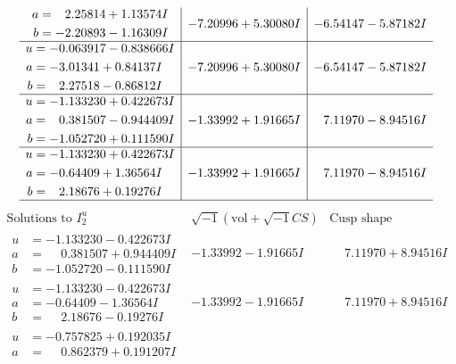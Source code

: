 \documentclass[1p]{elsarticle_modified}
\theoremstyle{definition}
\newcommand{\I}{\sqrt{-1}}
\begin{document}
$$\begin{array}{c|c|c}
\begin{aligned}
a &= \phantom{-}2.25814 + 1.13574 I \\
b &= -2.20893 - 1.16309 I\end{aligned}
 & -7.20996 + 5.30080 I & -6.54147 - 5.87182 I \\ \hline\begin{aligned}
u &= -0.063917 - 0.838666 I \\
a &= -3.01341 + 0.84137 I \\
b &= \phantom{-}2.27518 - 0.86812 I\end{aligned}
 & -7.20996 + 5.30080 I & -6.54147 - 5.87182 I \\ \hline\begin{aligned}
u &= -1.133230 + 0.422673 I \\
a &= \phantom{-}0.381507 - 0.944409 I \\
b &= -1.052720 + 0.111590 I\end{aligned}
 & -1.33992 + 1.91665 I & \phantom{-}7.11970 - 8.94516 I \\ \hline\begin{aligned}
u &= -1.133230 + 0.422673 I \\
a &= -0.64409 + 1.36564 I \\
b &= \phantom{-}2.18676 + 0.19276 I\end{aligned}
 & -1.33992 + 1.91665 I & \phantom{-}7.11970 - 8.94516 I\\
 \hline 
 \end{array}$$\newpage$$\begin{array}{c|c|c}  
\text{Solutions to }I^u_{2}& \I (\text{vol} + \sqrt{-1}CS) & \text{Cusp shape}\\
 \hline 
\begin{aligned}
u &= -1.133230 - 0.422673 I \\
a &= \phantom{-}0.381507 + 0.944409 I \\
b &= -1.052720 - 0.111590 I\end{aligned}
 & -1.33992 - 1.91665 I & \phantom{-}7.11970 + 8.94516 I \\ \hline\begin{aligned}
u &= -1.133230 - 0.422673 I \\
a &= -0.64409 - 1.36564 I \\
b &= \phantom{-}2.18676 - 0.19276 I\end{aligned}
 & -1.33992 - 1.91665 I & \phantom{-}7.11970 + 8.94516 I \\ \hline\begin{aligned}
u &= -0.757825 + 0.192035 I \\
a &= \phantom{-}0.862379 + 0.191207 I \\

\end{aligned}
\end{array}$$
\end{document}
